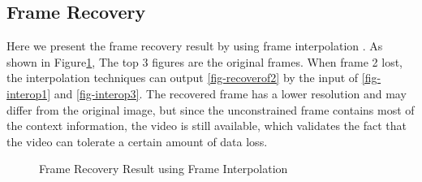 \documentclass[sigconf]{acmart}
\begin{document}
\subsection{Frame Recovery}
Here we present the frame recovery result by using frame interpolation \cite{meyer2015phase, niklaus2018context,van2017frame}. As shown in Figure\ref{fig-frameRecovery}, The top 3 figures are the original frames. When frame 2 lost, the interpolation techniques can output \ref{fig-recoverof2} by the input of \ref{fig-interop1} and \ref{fig-interop3}. The recovered frame has a lower resolution and may differ from the original image, but since the unconstrained frame contains most of the context information, the video is still available, which validates the fact that the video can tolerate a certain amount of data loss.

\begin{figure}[ht]
\centering
{}

\caption{Frame Recovery Result using Frame Interpolation}
\label{fig-frameRecovery}
\end{figure}
\end{document}
